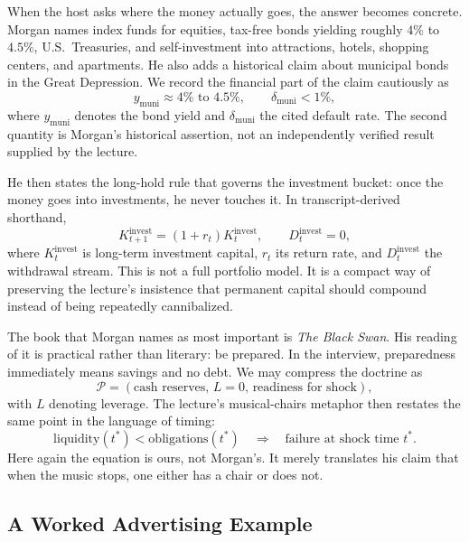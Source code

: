 When the host asks where the money actually goes, the answer becomes concrete. Morgan names index funds for equities, tax-free bonds yielding roughly \(4\%\) to \(4.5\%\), U.S.\ Treasuries, and self-investment into attractions, hotels, shopping centers, and apartments. He also adds a historical claim about municipal bonds in the Great Depression. We record the financial part of the claim cautiously as
\begin{equation}
y_{\mathrm{muni}} \approx 4\%\text{ to }4.5\%, \qquad \delta_{\mathrm{muni}} < 1\%,
\end{equation}
where \(y_{\mathrm{muni}}\) denotes the bond yield and \(\delta_{\mathrm{muni}}\) the cited default rate. The second quantity is Morgan's historical assertion, not an independently verified result supplied by the lecture.

He then states the long-hold rule that governs the investment bucket: once the money goes into investments, he never touches it. In transcript-derived shorthand,
\begin{equation}
K_{t+1}^{\mathrm{invest}} = (1+r_t)K_t^{\mathrm{invest}},
\qquad
D_t^{\mathrm{invest}} = 0,
\end{equation}
where \(K_t^{\mathrm{invest}}\) is long-term investment capital, \(r_t\) its return rate, and \(D_t^{\mathrm{invest}}\) the withdrawal stream. This is not a full portfolio model. It is a compact way of preserving the lecture's insistence that permanent capital should compound instead of being repeatedly cannibalized.

The book that Morgan names as most important is \emph{The Black Swan}. His reading of it is practical rather than literary: be prepared. In the interview, preparedness immediately means savings and no debt. We may compress the doctrine as
\begin{equation}
\mathcal{P} = (\text{cash reserves},\, L=0,\, \text{readiness for shock}),
\end{equation}
with \(L\) denoting leverage. The lecture's musical-chairs metaphor then restates the same point in the language of timing:
\begin{equation}
\text{liquidity}(t^{*}) < \text{obligations}(t^{*}) \quad \Longrightarrow \quad \text{failure at shock time } t^{*}.
\end{equation}
Here again the equation is ours, not Morgan's. It merely translates his claim that when the music stops, one either has a chair or does not.

\subsection{A Worked Advertising Example}


